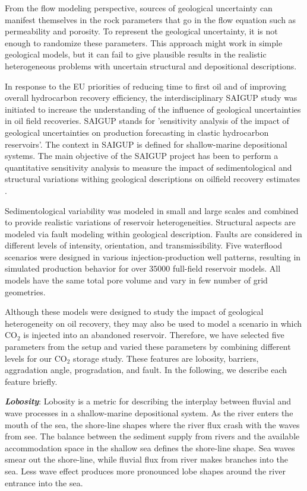 From the flow modeling perspective, sources of geological uncertainty can
manifest themselves in the rock parameters that go in the flow equation such as
permeability and porosity. To represent the geological uncertainty, it is not
enough to randomize these parameters. This approach might work in simple
geological models, but it can fail to give plausible results in the realistic
heterogeneous problems with uncertain structural and depositional descriptions.

In response to the EU priorities of reducing time to first oil and of improving
overall hydrocarbon recovery efficiency, the interdisciplinary SAIGUP study was
initiated to increase the understanding of the influence of geological
uncertainties in oil field recoveries. SAIGUP stands for 'sensitivity analysis
of the impact of geological uncertainties on production forecasting in clastic
hydrocarbon reservoirs'. The context in SAIGUP is defined for shallow-marine
depositional systems. The main objective of the SAIGUP project has been to
perform a quantitative sensitivity analysis to measure the impact of
sedimentological and structural variations withing geological descriptions on 
oilfield recovery estimates
\cite{howell2008sedimentological,manzocchi2008sensitivity,matthews2008assessing}
. 

Sedimentological variability was modeled in small and large scales and combined
to provide realistic variations of reservoir heterogeneities. Structural aspects
are modeled via fault modeling within geological description. Faults are
considered in different levels of intensity, orientation, and transmissibility.
Five waterflood scenarios were designed in various injection-production well
patterns, resulting in simulated production behavior for over $35000$ full-field
reservoir models. All models have the same total pore volume and vary in few
number of grid geometries. 

Although these models were designed to study the impact of geological
heterogeneity on oil recovery, they may also be used to model a scenario in
which $\mbox{CO}_2$ is injected into an abandoned reservoir. Therefore, we have
selected five parameters from the setup and varied these parameters by combining
different levels for our $\mbox{CO}_2$ storage study. These features are
lobosity, barriers, aggradation angle, progradation, and fault. In the
following, we describe each feature briefly.


\textbf{\textit{Lobosity}}: Lobosity is a metric for describing the interplay
between fluvial and wave processes in a shallow-marine depositional system. As
the river enters the mouth of the sea, the shore-line shapes where the river
flux crash with the waves from see. The balance between the sediment supply from
rivers and the available accommodation space in the shallow sea defines the
shore-line shape. Sea waves smear out the shore-line, while fluvial flux from
river makes branches into the sea. Less wave effect produces more pronounced
lobe shapes around the river entrance into the sea. 

